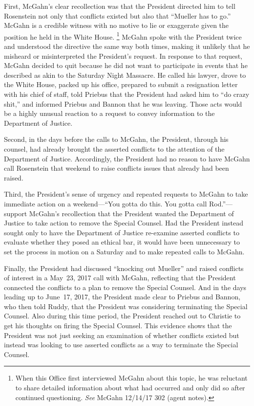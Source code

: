 First, McGahn's clear recollection was that the President directed him to tell Rosenstein not only that conflicts existed but also that ``Mueller has to go.''
McGahn is a credible witness with no motive to lie or exaggerate given the position he held in the White House.%
\footnote{When this Office first interviewed McGahn about this topic, he was reluctant to share detailed information about what had occurred and only did so after continued questioning.
\textit{See} McGahn 12/14/17 302 (agent notes).}
McGahn spoke with the President twice and understood the directive the same way both times, making it unlikely that he misheard or misinterpreted the President's request.
In response to that request, McGahn decided to quit because he did not want to participate in events that he described as akin to the Saturday Night Massacre.
He called his lawyer, drove to the White House, packed up his office, prepared to submit a resignation letter with his chief of staff, told Priebus that the President had asked him to ``do crazy shit,'' and informed Priebus and Bannon that he was leaving.
Those acts would be a highly unusual reaction to a request to convey information to the Department of Justice.

Second, in the days before the calls to McGahn, the President, through his counsel, had already brought the asserted conflicts to the attention of the Department of Justice.
Accordingly, the President had no reason to have McGahn call Rosenstein that weekend to raise conflicts issues that already had been raised.

Third, the President's sense of urgency and repeated requests to McGahn to take immediate action on a weekend---``You gotta do this.  You gotta call Rod.''---support McGahn's recollection that the President wanted the Department of Justice to take action to remove the Special Counsel.
Had the President instead sought only to have the Department of Justice re-examine asserted conflicts to evaluate whether they posed an ethical bar, it would have been unnecessary to set the process in motion on a Saturday and to make repeated calls to McGahn.

Finally, the President had discussed ``knocking out Mueller'' and raised conflicts of interest in a May~23, 2017 call with McGahn, reflecting that the President connected the conflicts to a plan to remove the Special Counsel.
And in the days leading up to June~17, 2017, the President made clear to Priebus and Bannon, who then told Ruddy, that the President was considering terminating the Special Counsel.
Also during this time period, the President reached out to Christie to get his thoughts on firing the Special Counsel.
This evidence shows that the President was not just seeking an examination of whether conflicts existed but instead was looking to use asserted conflicts as a way to terminate the Special Counsel.

